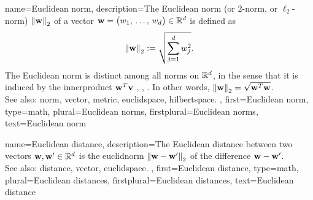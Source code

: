 {name={Euclidean norm}, 
	description={The 
		Euclidean \gls{norm} (or $2$-\gls{norm}, or $\ell_2$-\gls{norm}) $\normgeneric{\weights}{2}$ of a \gls{vector} 
		${\bf w} = \big(w_{1},\,\ldots,\,w_{d} \big) \in \mathbb{R}^{d}$
		is defined as 
		$$\normgeneric{\weights}{2} \defeq \sqrt{\sum_{\featureidx=1}^{\nrfeatures}\weight^2_{\featureidx}}.$$ 
		The Euclidean \gls{norm} is distinct among all \glspl{norm} on $\mathbb{R}^{d}$, in the sense 
		that it is induced by the \gls{innerproduct} ${\bf w}^{T} {\bf v}$ \cite{RudinBook}, \cite{BoydConvexBook}, \cite{HalmosFiniteDimVecSpace}. 
		In other words, $\normgeneric{\weights}{2}= \sqrt{\weights^{T} \weights}$.	
		\\
		See also: \gls{norm}, \gls{vector}, \gls{metric}, \gls{euclidspace}, \gls{hilbertspace}. },
	first={Euclidean norm},
	type=math,
	plural={Euclidean norms}, 
	firstplural={Euclidean norms},
	text={Euclidean norm} 
}

{name={Euclidean distance}, 
	description={The Euclidean \gls{distance} between two 
		\glspl{vector} ${\bf w},{\bf w}' \in \mathbb{R}^{d}$ is the \gls{euclidnorm} 
		$\normgeneric{\vw-\vw'}{2}$ of the difference ${\bf w}-{\bf w}'$.	
		\\
		See also: \gls{distance}, \gls{vector}, \gls{euclidspace}. },
	first={Euclidean distance},
	type=math,
	plural={Euclidean distances},
	firstplural={Euclidean distances},
	text={Euclidean distance} 
}

